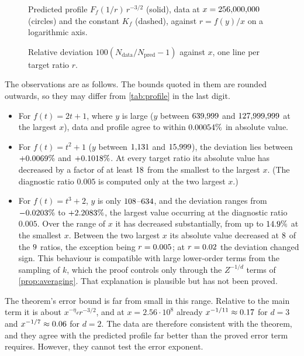 \begin{figure}[ht]
\centering

\caption{Predicted profile $F_f(1/r)\,r^{-3/2}$ (solid), data at $x=256{,}000{,}000$ (circles) and the constant $K_f$ (dashed), against $r=f(y)/x$ on a logarithmic axis.}\label{fig:profile}
\end{figure}

\begin{figure}[ht]
\centering

\caption{Relative deviation $100(N_{\mathrm{data}}/N_{\mathrm{pred}}-1)$ against $x$, one line per target ratio $r$.}\label{fig:deviation}
\end{figure}

The observations are as follows. The bounds quoted in them are rounded outwards, so they may differ from \cref{tab:profile} in the last digit.
\begin{itemize}
\item For $f(t)=2t+1$, where $y$ is large ($y$ between $639{,}999$ and $127{,}999{,}999$ at the largest $x$), data and profile agree to within $0.00054\%$ in absolute value.
\item For $f(t)=t^2+1$ ($y$ between $1{,}131$ and $15{,}999$), the deviation lies between $+0.0069\%$ and $+0.1018\%$. At every target ratio its absolute value has decreased by a factor of at least $18$ from the smallest to the largest $x$. (The diagnostic ratio $0.005$ is computed only at the two largest $x$.)
\item For $f(t)=t^3+2$, $y$ is only $108$--$634$, and the deviation ranges from $-0.0203\%$ to $+2.2083\%$, the largest value occurring at the diagnostic ratio $0.005$. Over the range of $x$ it has decreased substantially, from up to $14.9\%$ at the smallest $x$. Between the two largest $x$ its absolute value decreased at $8$ of the $9$ ratios, the exception being $r=0.005$; at $r=0.02$ the deviation changed sign. This behaviour is compatible with large lower-order terms from the sampling of $k$, which the proof controls only through the $Z^{-1/d}$ terms of \cref{prop:averaging}. That explanation is plausible but has not been proved.
\end{itemize}
The theorem's error bound is far from small in this range. Relative to the main term it is about $x^{-\eta_d}r^{-3/2}$, and at $x=2.56\cdot10^8$ already $x^{-1/11}\approx0.17$ for $d=3$ and $x^{-1/7}\approx0.06$ for $d=2$. The data are therefore consistent with the theorem, and they agree with the predicted profile far better than the proved error term requires. However, they cannot test the error exponent.


